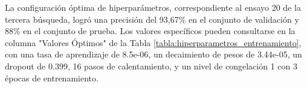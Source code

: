 La configuración óptima de hiperparámetros, correspondiente al ensayo 20 de la tercera búsqueda, logró una precisión del 93,67\% en el conjunto de validación y 88\% en el conjunto de prueba. Los valores específicos pueden consultarse en la columna "Valores Óptimos" de la Tabla \ref{tabla:hiperparametros_entrenamiento}, con una tasa de aprendizaje de 8.5e-06, un decaimiento de pesos de 3.44e-05, un dropout de 0.399, 16 pasos de calentamiento, y un nivel de congelación 1 con 3 épocas de entrenamiento.

